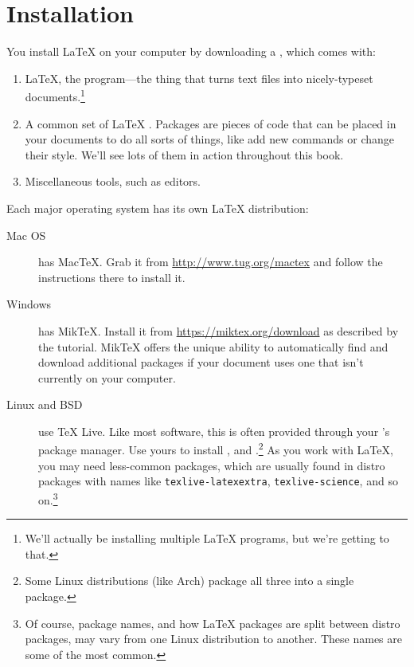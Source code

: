 \chapter{Installation}
\label{installation}

You install \LaTeX{} on your computer by downloading a ,
which comes with:
\begin{enumerate}
\item \LaTeX, the program---the thing that turns text files into nicely-typeset
    documents.\footnote{We'll actually be installing multiple \LaTeX{} programs,
    but we're getting to that.}
\item A common set of \LaTeX{} .
    Packages are pieces of code that can be placed in your documents to
    do all sorts of things, like add new commands or change their style.
    We'll see lots of them in action throughout this book.
\item Miscellaneous tools, such as editors.
\end{enumerate}
Each major operating system has its own \LaTeX{} distribution:
\begin{description}
\item[Mac OS] has Mac\TeX. Grab it from \url{http://www.tug.org/mactex}
    and follow the instructions there to install it.

\item[Windows] has Mik\TeX.
    Install it from \url{https://miktex.org/download}
    as described by the tutorial.
    Mik\TeX{} offers the unique ability to automatically find and download
    additional packages if your document uses one that isn't currently
    on your computer.

\item[Linux and BSD] use \TeX{} Live.
    Like most software, this is often provided through your
    's package manager.
    Use yours to install ,
     and .\punckern\footnote{%
    Some Linux distributions (like Arch) package all three into a
    single  package.}
    As you work with \LaTeX, you may need less-common packages,
    which are usually found in distro packages with names like
    \texttt{texlive-latexextra}, \texttt{texlive-science},
    and so on.\punckern\footnote{Of
    course, package names, and how \LaTeX{} packages are split between
    distro packages, may vary from one Linux distribution to another.
    These names are some of the most common.}
\end{description}

